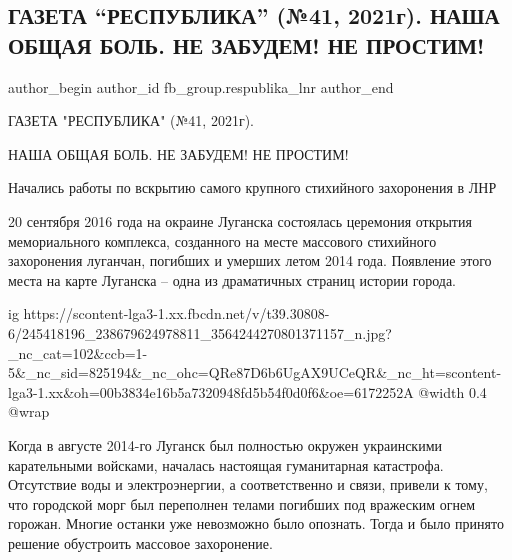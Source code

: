  
 
 
 
 
 
\subsection{ГАЗЕТА \enquote{РЕСПУБЛИКА} (№41, 2021г). НАША ОБЩАЯ БОЛЬ. НЕ ЗАБУДЕМ! НЕ ПРОСТИМ!}
\label{sec:14_10_2021.fb.fb_group.respublika_lnr.3.lugansk_zahoronenie_2014}
 
\ifcmt
 author_begin
   author_id fb_group.respublika_lnr
 author_end
\fi

ГАЗЕТА "РЕСПУБЛИКА" (№41, 2021г).

НАША ОБЩАЯ БОЛЬ. НЕ ЗАБУДЕМ! НЕ ПРОСТИМ!

Начались работы по вскрытию самого крупного стихийного захоронения в ЛНР

20 сентября 2016 года на окраине Луганска состоялась церемония открытия
мемориального комплекса, созданного на месте массового стихийного захоронения
луганчан, погибших и умерших летом 2014 года. Появление этого места на карте
Луганска – одна из драматичных страниц истории города. 

\ifcmt
  ig https://scontent-lga3-1.xx.fbcdn.net/v/t39.30808-6/245418196_238679624978811_3564244270801371157_n.jpg?_nc_cat=102&ccb=1-5&_nc_sid=825194&_nc_ohc=QRe87D6b6UgAX9UCeQR&_nc_ht=scontent-lga3-1.xx&oh=00b3834e16b5a7320948fd5b54f0d0f6&oe=6172252A
  @width 0.4
  @wrap 
\fi

Когда в августе 2014-го Луганск был полностью окружен украинскими карательными
войсками, началась настоящая гуманитарная катастрофа. Отсутствие воды и
электроэнергии, а соответственно и связи, привели к тому, что городской морг
был переполнен телами погибших под вражеским огнем горожан. Многие останки уже
невозможно было опознать. Тогда и было принято решение обустроить массовое
захоронение. 

